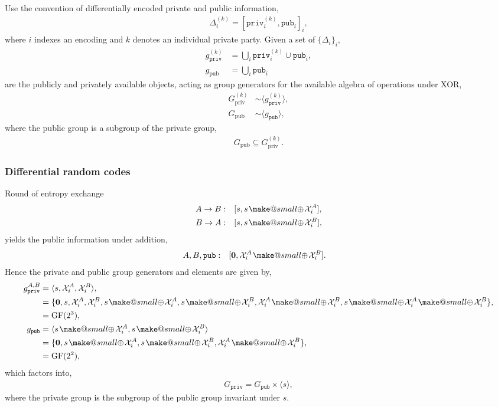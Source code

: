 \documentclass[twocolumn, aps, amsmath, amssymb, nofootinbib, superscriptaddress, longbibliography, doublefloatfix, table-of-contents, eqsecnum, rmp]{revtex4-2}
\makeatletter
\def\zerovec{\mathbf{0}}
\newcommand{\soplus}{{{\hspace{1pt}}{\mathbin{\mathpalette\make@small{\mathbin\oplus}}}}{\hspace{1pt}}}
\newcommand{\make@small}[2]{%
  \vcenter{\hbox{%
    \scalebox{0.6}{$\m@th#1#2$}%
  }}%
}
\makeatother
\begin{document}
Use the convention of differentially encoded private and public information,
\begin{align}
	\Delta_i^{(k)} = [\mathtt{priv}_i^{(k)},\mathtt{pub}_i]_i,
\end{align}
where $i$ indexes an encoding and $k$ denotes an individual private party. Given a set of $\{\Delta_i\}_i$,
\begin{align}
	g_\mathtt{priv}^{(k)} &= \bigcup_i \mathtt{priv}_i^{(k)} \cup \mathtt{pub}_i,\nonumber\\
	g_\mathrm{pub} &=  \bigcup_i \mathtt{pub}_i
\end{align}
are the publicly and privately available objects, acting as group generators for the available algebra of operations under XOR,
\begin{align}
	G_\mathrm{priv}^{(k)} &\sim \langle g_\mathtt{priv}^{(k)} \rangle, \nonumber\\
	G_\mathrm{pub} &\sim \langle g_\mathtt{pub} \rangle,
\end{align}
where the public group is a subgroup of the private group,
\begin{align}
	G_\mathrm{pub} \subseteq G_\mathrm{priv}^{(k)}.
\end{align}

\subsubsection{Differential random codes}

Round of entropy exchange
\begin{align}
	A\to B:\quad &[s, s\soplus \mathcal{X}_i^A], \nonumber\\
	B\to A:\quad &[s, s\soplus \mathcal{X}_i^B],
\end{align}
yields the public information under addition,
\begin{align}
	A,B,\mathtt{pub}:\quad &[\zerovec, \mathcal{X}_i^A \soplus \mathcal{X}_i^B].
\end{align}
Hence the private and public group generators and elements are given by,
\begin{align}
	g_\mathtt{priv}^{A,B} &= \langle s, \mathcal{X}_i^A, \mathcal{X}_i^B \rangle,\nonumber\\
	&= \{\zerovec, s, \mathcal{X}_i^A, \mathcal{X}_i^B, s\soplus \mathcal{X}_i^A, s\soplus \mathcal{X}_i^B, \mathcal{X}_i^A \soplus \mathcal{X}_i^B, s\soplus \mathcal{X}_i^A \soplus \mathcal{X}_i^B \},\nonumber\\
	&= \mathrm{GF}(2^3), \nonumber\\
	g_\mathtt{pub} &= \langle s\soplus \mathcal{X}_i^A, s\soplus \mathcal{X}_i^B \rangle \nonumber\\
	&= \{\zerovec, s\soplus \mathcal{X}_i^A, s\soplus \mathcal{X}_i^B, \mathcal{X}_i^A \soplus \mathcal{X}_i^B \}, \nonumber\\
	&= \mathrm{GF}(2^2),
\end{align}
which factors into,
\begin{align}
	G_\mathtt{priv} = G_\mathtt{pub} \times \langle s\rangle,
\end{align}
where the private group is the subgroup of the public group invariant under $s$.
\end{document}
